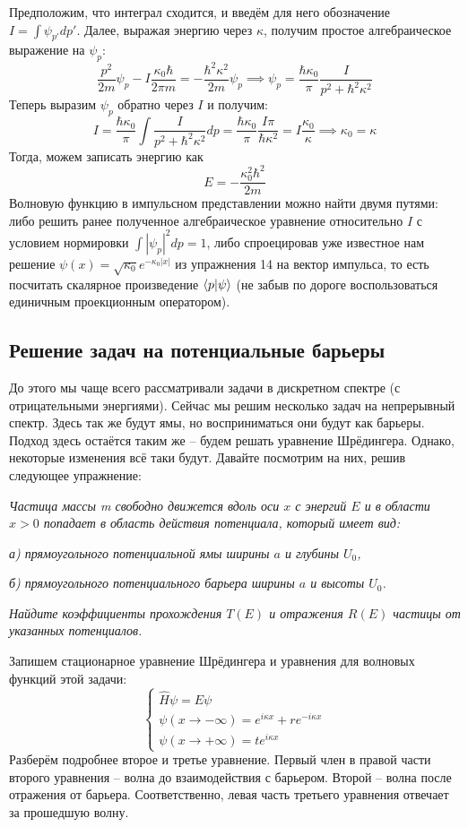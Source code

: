 Предположим, что интеграл сходится, и введём для него обозначение $I = \int \psi_{p'}dp'$. Далее, выражая энергию через $\kappa$, получим простое алгебраическое выражение на $\psi_p$:
\[
\frac{p^2}{2m}\psi_p - I\frac{\kappa_0\hbar}{2\pi m} = -\frac{\hbar^2\kappa^2}{2m}\psi_p \implies \psi_p = \frac{\hbar\kappa_0}{\pi}\frac{I}{p^2 + \hbar^2\kappa^2}
\]
Теперь выразим $\psi_p$ обратно через $I$ и получим:
\[
I = \frac{\hbar\kappa_0}{\pi}\int\frac{I}{p^2 + \hbar^2\kappa^2}dp = \frac{\hbar \kappa_0}{\pi}\frac{I \pi}{\hbar\kappa^2} = I\frac{\kappa_0}{\kappa} \implies \kappa_0 = \kappa
\]
Тогда, можем записать энергию как 
\[
E = -\frac{\kappa^2_0\hbar^2}{2m}
\]
Волновую функцию в импульсном представлении можно найти двумя путями: либо решить ранее полученное алгебраическое уравнение относительно $I$ с условием нормировки $\int|\psi_p|^2dp = 1$, либо спроецировав уже известное нам решение $\psi(x) =\sqrt{\kappa_0}e^{-\kappa_0|x|}$ из упражнения 14 на вектор импульса, то есть посчитать скалярное произведение $\bra{p}\ket{\psi}$ (не забыв по дороге воспользоваться единичным проекционным оператором).
\subsection{Решение задач на потенциальные барьеры}
До этого мы чаще всего рассматривали задачи в дискретном спектре (с отрицательными энергиями). Сейчас мы решим несколько задач на непрерывный спектр. Здесь так же будут ямы, но восприниматься они будут как барьеры. Подход здесь остаётся таким же -- будем решать уравнение Шрёдингера. Однако, некоторые изменения всё таки будут. Давайте посмотрим на них, решив следующее упражнение:
\begin{center}
    \textit{Частица массы m свободно движется вдоль оси $x$ с энергий $E$ и в области $x>0$ попадает в область действия потенциала, который имеет вид:}
    
    \textit{а) прямоугольного потенциальной ямы ширины $a$ и глубины $U_0$,}

    \textit{б) прямоугольного потенциального барьера ширины $a$ и высоты $U_0$.}
    
    \textit{Найдите коэффициенты прохождения $T(E)$ и отражения $R(E)$ частицы от указанных потенциалов.}
\end{center}

Запишем стационарное уравнение Шрёдингера и уравнения для волновых функций этой задачи:
\[
\begin{cases}
\hat H\psi=E\psi \\
\psi(x\rightarrow -\infty) = e^{i\kappa x} + re^{-i\kappa x} \\
\psi(x \rightarrow +\infty) = te^{i\kappa x}
\end{cases}
\]
Разберём подробнее второе и третье уравнение. Первый член в правой части второго уравнения – волна до взаимодействия с барьером. Второй – волна после отражения от барьера. Соответственно, левая часть третьего уравнения отвечает за прошедшую волну. 

